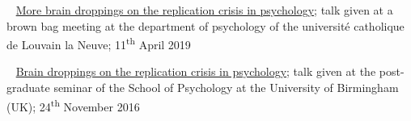 




\textbullet~ \href{https://osf.io/vu327/}{More brain droppings on the replication crisis in psychology}; 
talk given at a brown bag meeting at the department of psychology of the université catholique de Louvain la Neuve; 
11\textsuperscript{th} April 2019

\textbullet~ \href{https://dx.doi.org/10.6084/m9.figshare.4257992.v1}{Brain droppings on the replication crisis in psychology}; talk given at the post-graduate seminar of the School of Psychology at the University of Birmingham (UK); 
24\textsuperscript{th} November 2016

